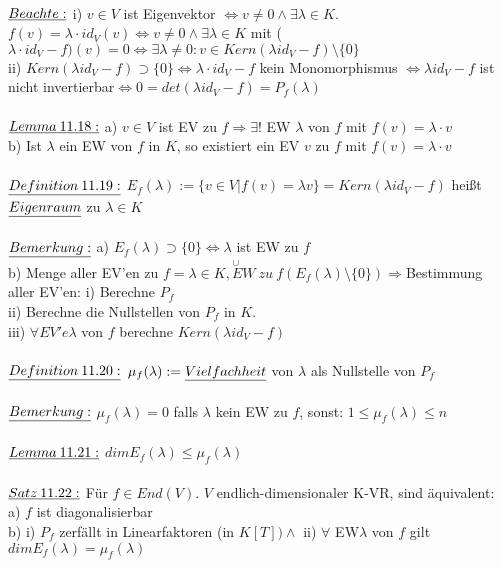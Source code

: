 \documentclass[fleqn, a4paper, 11pt]{article}
\begin{document}
\\
$\uline{Beachte:}$ i) $v\in V$ ist Eigenvektor $\Leftrightarrow v\neq 0\wedge \exists\lambda\in K$. $f(v)=\lambda\cdot id_V(v)\Leftrightarrow v\neq 0\wedge\exists\lambda\in K$ mit ($\lambda\cdot id_V -f)(v)=0\Leftrightarrow\exists\lambda\neq 0:v\in Kern(\lambda id_V-f)\setminus\{0\}$\\
ii) $Kern(\lambda id_V-f)\supset\{0\}\Leftrightarrow \lambda\cdot id_V -f$ kein Monomorphismus $\Leftrightarrow \lambda id_V -f$ ist nicht invertierbar$\Leftrightarrow 0=det(\lambda id_V-f)=P_f(\lambda)$\\
\\
$\uline{Lemma\:11.18:}$ a) $v\in V$ ist EV zu $f\Rightarrow\exists!$ EW $\lambda$ von $f$ mit $f(v)=\lambda\cdot v$\\
b) Ist $\lambda$ ein EW von $f$ in $K$, so existiert ein EV $v$ zu $f$ mit $f(v)=\lambda\cdot v$\\
\\
$\uline{Definition\:11.19:}$ $E_f(\lambda):=\{v\in V|f(v)=\lambda v\}=Kern(\lambda id_V-f)$ hei\ss{}t $\uline{Eigenraum}$ zu $\lambda\in K$\\
\\
$\uline{Bemerkung:}$ a) $E_f(\lambda)\supset\{0\}\Leftrightarrow \lambda$ ist EW zu $f$\\
b) Menge aller EV'en zu $f=\stackrel{\cup}{\lambda\in K,EW\:zu\:f}(E_f(\lambda)\setminus\{0\})\Rightarrow$Bestimmung aller EV'en: i) Berechne $P_f$\\
ii) Berechne die Nullstellen von $P_f$ in $K$.\\
iii) $\forall EV'e\lambda$ von $f$ berechne $Kern(\lambda id_V-f)$\\
\\
$\uline{Definition\:11.20:}$ $\mu_f(\lambda):=\uline{Vielfachheit}$ von $\lambda$ als Nullstelle von $P_f$\\
\\
$\uline{Bemerkung:}$ $\mu_f(\lambda)=0$ falls $\lambda$ kein EW zu $f$, sonst: $1\leq \mu_f(\lambda)\leq n$\\
\\
$\uline{Lemma\:11.21:}$ $dim E_f(\lambda)\leq \mu_f(\lambda)$\\
\\
$\uline{Satz\:11.22:}$ F\"ur $f\in End(V)$. $V$ endlich-dimensionaler K-VR, sind \"aquivalent:\\
a) $f$ ist diagonalisierbar\\
b) i) $P_f$ zerf\"allt in Linearfaktoren (in $K[T])\wedge$ ii) $\forall$ EW$\lambda$ von $f$ gilt $dim E_f(\lambda)=\mu_f(\lambda)$\\
\end{document}
